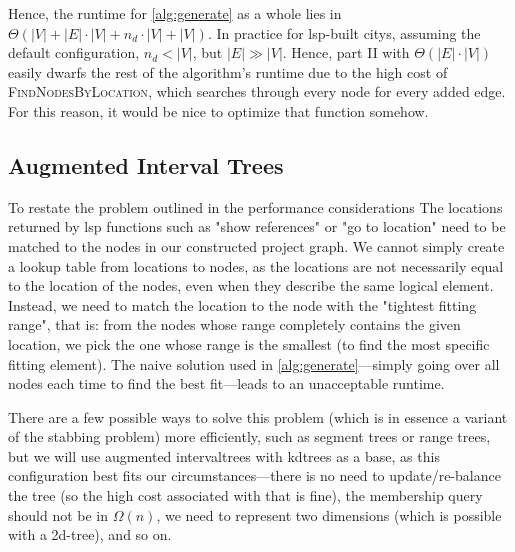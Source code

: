\documentclass[../thesis]{subfiles}
\begin{document}
Hence, the runtime for \cref{alg:generate} as a whole lies in $\Theta(|V| + |E| \cdot |V| + n_d \cdot |V| + |V|)$.
In practice for \gls{lsp}-built \glspl{city}, assuming the default configuration, $n_d < |V|$, but $|E| \gg |V|$. %
Hence, part II with $\Theta(|E| \cdot |V|)$ easily dwarfs the rest of the algorithm's runtime due to the high cost of \textsc{FindNodesByLocation}, which searches through every node for every added edge.
For this reason, it would be nice to optimize that function somehow.

\subsection{Augmented Interval Trees}\label{subsec:kd}
To restate the problem outlined in the performance considerations 
The locations returned by \gls{lsp} functions such as "show references" or "go to location" need to be matched to the nodes in our constructed project graph.
We cannot simply create a lookup table from locations to nodes, as the locations are not necessarily equal to the location of the nodes, even when they describe the same logical element.
Instead, we need to match the location to the node with the "tightest fitting range",
that is: from the nodes whose \gls{range} completely contains the given location, we pick the one whose \gls{range} is the smallest (to find the most specific fitting element).
The naive solution used in \cref{alg:generate}---simply going over all nodes each time to find the best fit---leads to an unacceptable runtime.

There are a few possible ways to solve this problem (which is in essence a variant of the stabbing problem) more efficiently, such as segment trees or range trees, but we will use augmented \glspl{intervaltree} with \glspl{kdtree} as a base, as this configuration best fits our circumstances—there is no need to update/re-balance the tree (so the high cost associated with that is fine), the membership query should not be in $\Omega(n)$, we need to represent two dimensions (which is possible with a 2d-tree), and so on.
\end{document}
